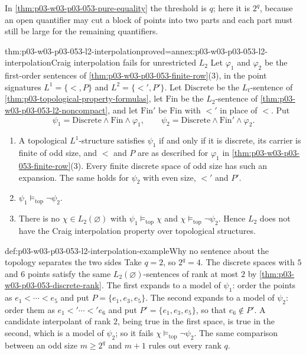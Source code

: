 In \cref{thm:p03-w03-p03-053-pure-equality} the threshold is \(q\); here
it is \(2^q\), because an open quantifier may cut a block of points into
two parts and each part must still be large for the remaining
quantifiers.

\begin{hbtheorem}{thm:p03-w03-p03-053-l2-interpolation}{proved=annex:p03-w03-p03-053-l2-interpolation}{Craig interpolation fails for unrestricted \texorpdfstring{\(L_2\)}{L2}}
Let \(\varphi_1\) and \(\varphi_2\) be the first-order sentences of
\cref{thm:p03-w03-p03-053-finite-row}(3), in the point signatures
\(L^1=\{<,P\}\) and \(L^2=\{<',P'\}\). Let \(\mathrm{Discrete}\) be the
\(L_t\)-sentence of \cref{thm:p03-topological-property-formulas}, let
\(\mathrm{Fin}\) be the \(L_2\)-sentence of
\cref{thm:p03-w03-p03-053-l2-noncompact}, and let \(\mathrm{Fin}'\) be
\(\mathrm{Fin}\) with \(<'\) in place of \(<\). Put
\[
 \psi_1=\mathrm{Discrete}\land\mathrm{Fin}\land\varphi_1,
 \qquad
 \psi_2=\mathrm{Discrete}\land\mathrm{Fin}'\land\varphi_2 .
\]
\begin{enumerate}
\item A topological \(L^1\)-structure satisfies \(\psi_1\) if and only if
  it is discrete, its carrier is finite of odd size, and \(<\) and \(P\)
  are as described for \(\varphi_1\) in
  \cref{thm:p03-w03-p03-053-finite-row}(3). Every finite discrete space
  of odd size has such an expansion. The same holds for \(\psi_2\) with
  even size, \(<'\) and \(P'\).
\item \(\psi_1\models_{\mathrm{top}}\neg\psi_2\).
\item There is no \(\chi\in L_2(\varnothing)\) with
  \(\psi_1\models_{\mathrm{top}}\chi\) and
  \(\chi\models_{\mathrm{top}}\neg\psi_2\). Hence \(L_2\) does not have
  the Craig interpolation property over topological structures.
\end{enumerate}
\end{hbtheorem}

\begin{hbexample}{def:p03-w03-p03-053-l2-interpolation-example}{Why no sentence about the topology separates the two sides}
Take \(q=2\), so \(2^q=4\). The discrete spaces with \(5\) and \(6\)
points satisfy the same \(L_2(\varnothing)\)-sentences of rank at most
\(2\) by \cref{thm:p03-w03-p03-053-discrete-rank}. The first expands to a
model of \(\psi_1\): order the points as \(e_1<\cdots<e_5\) and put
\(P=\{e_1,e_3,e_5\}\). The second expands to a model of \(\psi_2\):
order them as \(e_1<'\cdots<'e_6\) and put \(P'=\{e_1,e_3,e_5\}\), so
that \(e_6\notin P'\). A candidate interpolant of rank \(2\), being true in
the first space, is true in the second, which is a model of \(\psi_2\);
so it fails \(\chi\models_{\mathrm{top}}\neg\psi_2\). The same comparison
between an odd size \(m\ge2^q\) and \(m+1\) rules out every rank \(q\).
\end{hbexample}

